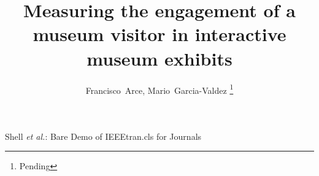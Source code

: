 \documentclass[journal]{IEEEtran}
\begin{document}
\title{Measuring the engagement of a museum visitor in interactive museum exhibits}
%

\author{Francisco~Arce,
        Mario~Garcia-Valdez
\thanks{Pending}%
}

% 
%



%
{Shell \MakeLowercase{\textit{et al.}}: Bare Demo of IEEEtran.cls for Journals}
% 











\maketitle
\end{document}
